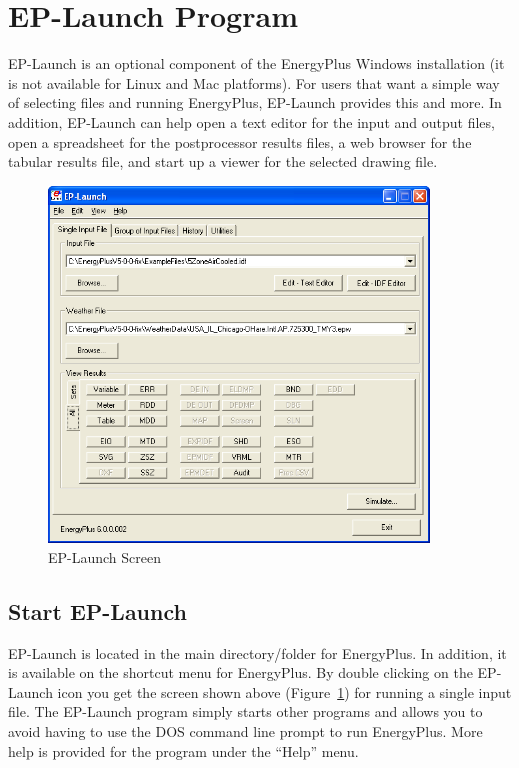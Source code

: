 \section{EP-Launch Program}\label{ep-launch-program}

EP-Launch is an optional component of the EnergyPlus Windows installation (it is not available for Linux and Mac platforms). For users that want a simple way of selecting files and running EnergyPlus, EP-Launch provides this and more. In addition, EP-Launch can help open a text editor for the input and output files, open a spreadsheet for the postprocessor results files, a web browser for the tabular results file, and start up a viewer for the selected drawing file.

\begin{figure}[hbtp] %
\centering
\includegraphics[width=0.9\textwidth, height=0.9\textheight, keepaspectratio=true]{media/image101.png}
\caption{EP-Launch Screen \protect \label{fig:ep-launch-screen}}
\end{figure}

\subsection{Start EP-Launch}\label{start-ep-launch}

EP-Launch is located in the main directory/folder for EnergyPlus. In addition, it is available on the shortcut menu for EnergyPlus. By double clicking on the EP-Launch icon you get the screen shown above (Figure~\ref{fig:ep-launch-screen}) for running a single input file. The EP-Launch program simply starts other programs and allows you to avoid having to use the DOS command line prompt to run EnergyPlus. More help is provided for the program under the ``Help'' menu.

